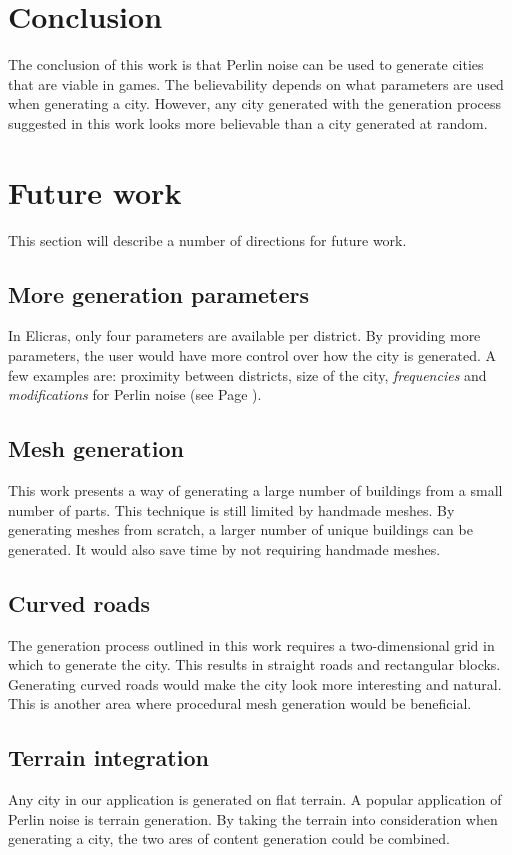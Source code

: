 \section{Conclusion}
The conclusion of this work is that Perlin noise can be used to generate cities that are viable in games. The believability depends on what parameters are used when generating a city. However, any city generated with the generation process suggested in this work looks more believable than a city generated at random.
	
\section{Future work}
This section will describe a number of directions for future work.
	
	\subsection{More generation parameters}
	In Elicras, only four parameters are available per district. By providing more parameters, the user would have more control over how the city is generated. A few examples are: proximity between districts, size of the city, \textit{frequencies} and \textit{modifications} for Perlin noise (see Page \pageref{fig:normal-and-modified-perlin}).
	
	\subsection{Mesh generation}
	This work presents a way of generating a large number of buildings from a small number of parts. This technique is still limited by handmade meshes. By generating meshes from scratch, a larger number of unique buildings can be generated. It would also save time by not requiring handmade meshes.
		
	\subsection{Curved roads}
	The generation process outlined in this work requires a two-dimensional grid in which to generate the city. This results in straight roads and rectangular blocks. Generating curved roads would make the city look more interesting and natural. This is another area where procedural mesh generation would be beneficial.
		
	\subsection{Terrain integration}
	Any city in our application is generated on flat terrain. A popular application of Perlin noise is terrain generation. By taking the terrain into consideration when generating a city, the two ares of content generation could be combined.